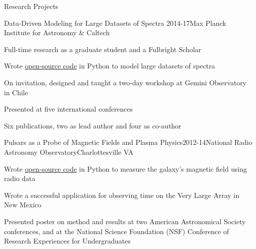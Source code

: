 \documentclass{resume} %
\begin{document}

\begin{rSection}{Research Projects}
  \begin{rSubsection}{Data-Driven Modeling for Large Datasets of Spectra}
    {2014-17}{Max Planck Institute for Astronomy \& Caltech}{}
  \item 
    Full-time research as a graduate student and a Fulbright Scholar 
  \item
    Wrote \href{https://github.com/annayqho/TheCannon}{open-source code} in Python to model large datasets of spectra
  \item
    On invitation, designed and taught a two-day workshop %
    at Gemini Observatory in Chile %
  \item
    Presented at five international conferences
  \item
    Six publications, two as lead author and four as co-author 
\end{rSubsection}

\begin{rSubsection}{Pulsars as a Probe of Magnetic Fields and Plasma Physics}{2012-14}{National Radio Astronomy Observatory}{Charlottesville VA}
  \item 
    Wrote \href{https://github.com/annayqho/ter5-RMs}{open-source code} in Python to measure the 
    galaxy's magnetic field using radio data
  \item Wrote a successful application for observing time on the 
    Very Large Array in New Mexico
  \item Presented poster on method and results at two
    American Astronomical Society conferences,
    and at the National Science Foundation (NSF) Conference of 
    Research Experiences for Undergraduates
\end{rSubsection}

\end{rSection}

\end{document}
